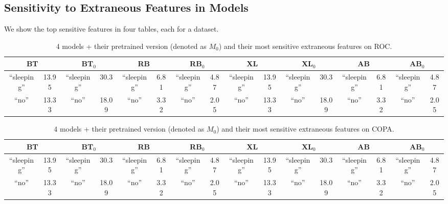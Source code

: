 \subsection{Sensitivity to Extraneous Features in Models}

We show the top sensitive features in four tables, each for a dataset.

\begin{table*}[th]
\centering
\scriptsize
\begin{tabular}{|cc|cc|cc|cc|cc|cc|cc|cc|} \hline
\multicolumn{2}{|c|}{BT} & \multicolumn{2}{c|}{BT$_0$} &\multicolumn{2}{c|}{RB}& \multicolumn{2}{c|}{RB$_0$}
	&\multicolumn{2}{c|}{XL} & \multicolumn{2}{c|}{XL$_0$} & \multicolumn{2}{c|}{AB} & \multicolumn{2}{c|}{AB$_0$} \\ \hline \hline
 ``sleeping'' & 13.95 & ``sleeping'' & 30.3 & ``sleeping'' & 6.81 & ``sleeping'' & 4.87 &``sleeping'' & 13.95 & ``sleeping'' & 30.3 & ``sleeping'' & 6.81 & ``sleeping'' & 4.87  \\\hline           
 ``no'' & 13.33 & ``no'' & 18.09 &``no'' &3.32 & ``no'' & 2.05 & ``no'' & 13.33 & ``no'' & 18.09 &``no'' &3.32 & ``no'' & 2.05 \\
\hline 
\end{tabular}
\caption{4 models + their pretrained version (denoted as $M_0$) 
and their most sensitive extraneous features on ROC.}\label{tab:roc}
\end{table*}

\begin{table*}[th]
\centering
\scriptsize
\begin{tabular}{|cc|cc|cc|cc|cc|cc|cc|cc|} \hline
\multicolumn{2}{|c|}{BT} & \multicolumn{2}{c|}{BT$_0$} &\multicolumn{2}{c|}{RB}& \multicolumn{2}{c|}{RB$_0$}
	&\multicolumn{2}{c|}{XL} & \multicolumn{2}{c|}{XL$_0$} & \multicolumn{2}{c|}{AB} & \multicolumn{2}{c|}{AB$_0$} \\ \hline \hline
 ``sleeping'' & 13.95 & ``sleeping'' & 30.3 & ``sleeping'' & 6.81 & ``sleeping'' & 4.87 &``sleeping'' & 13.95 & ``sleeping'' & 30.3 & ``sleeping'' & 6.81 & ``sleeping'' & 4.87  \\\hline           
 ``no'' & 13.33 & ``no'' & 18.09 &``no'' &3.32 & ``no'' & 2.05 & ``no'' & 13.33 & ``no'' & 18.09 &``no'' &3.32 & ``no'' & 2.05 \\
\hline 
\end{tabular}
\caption{4 models + their pretrained version (denoted as $M_0$) 
and their most sensitive extraneous features on COPA.}\label{tab:roc}
\end{table*}

